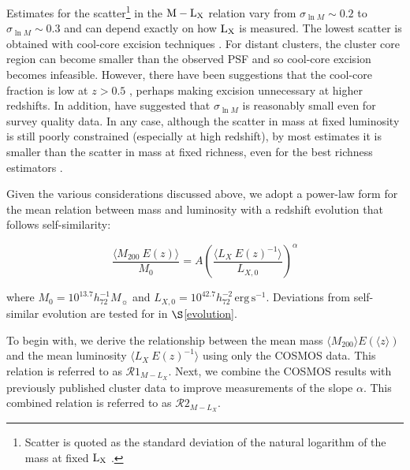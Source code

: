 \documentclass[12pt]{emulateapj}
\newcommand{\lum}{h_{72}^{-2}\,\mathrm{erg}\,\mathrm{s}^{-1}}
\newcommand{\mlx}{$\rm{M} - \rm{L}_{\rm X}$ }
\newcommand{\lx}{$\rm{L}_{\rm X}$ }
\newcommand{\mass}{h_{72}^{-1} M_{\sun}}
\newcommand{\eg}{{\it e.g.}}
\begin{document}
Estimates for the scatter\footnote[7]{Scatter is quoted as the
  standard deviation of the natural logarithm of the mass at fixed
  \lx.} in the \mlx relation vary from $\sigma_{\ln M} \sim 0.2$ to
$\sigma_{\ln M} \sim 0.3$ and can depend exactly on how \lx is
measured. The lowest scatter is obtained with cool-core excision
techniques \citep[][]{Stanek:2006, Maughan:2007, Pratt:2008}. For
distant clusters, the cluster core region can become smaller than the
observed PSF and so cool-core excision becomes infeasible. However,
there have been suggestions that the cool-core fraction is low at
$z>0.5$ \citep[][]{Vikhlinin:2007}, perhaps making excision
unnecessary at higher redshifts. In addition, \citet[][]{Maughan:2007}
have suggested that $\sigma_{\ln M}$ is reasonably small even for
survey quality data. In any case, although the scatter in mass at
fixed luminosity is still poorly constrained (especially at high
redshift), by most estimates it is smaller than the scatter in mass at
fixed richness, even for the best richness estimators \citep[\eg][find
$\sigma_{\ln M |\lambda}=0.45$]{Rozo:2008}.

Given the various considerations discussed above, we adopt a power-law
form for the mean relation between mass and luminosity with a redshift
evolution that follows self-similarity:

\begin{equation}
  \frac{\langle  M_{200}~E(z) \rangle}{M_0} = A \left( \frac{\langle L_{X}~E(z)^{-1}\rangle }{L_{X,0}} \right)^{\alpha}
\label{eq:lx_m}
\end{equation}

\noindent where $M_0=10^{13.7} \mass$ and
$L_{X,0}=10^{42.7} \lum$. Deviations from self-similar evolution are
tested for in $\S$\ref{evolution}.

To begin with, we derive the relationship between the mean mass
$\langle M_{200}\rangle E(\langle z \rangle)$ and the mean luminosity
$\langle L_{X}~E(z)^{-1}\rangle $ using only the COSMOS data. This
relation is referred to as $\mathcal{R}1_{M-L_{X}}$. Next, we combine
the COSMOS results with previously published cluster data to improve
measurements of the slope $\alpha$. This combined relation is referred
to as $\mathcal{R}2_{M-L_{X}}$.

\end{document}
